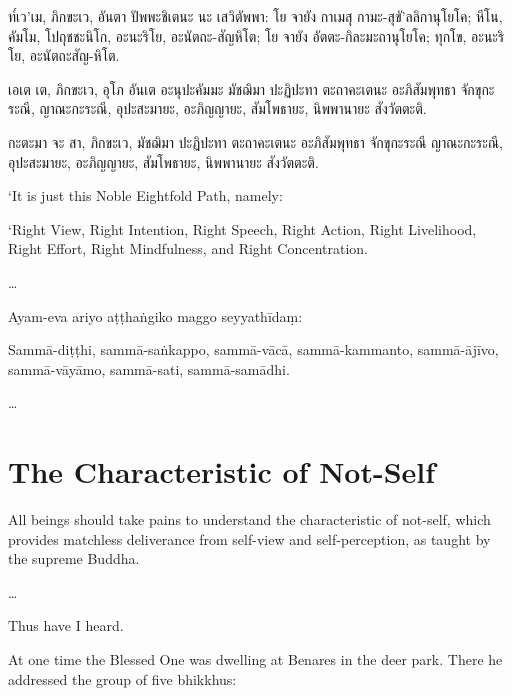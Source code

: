 ท๎เว’เม, ภิกขะเว, อันตา ปัพพะชิเตนะ นะ เสวิตัพพา: โย จายัง กาเมสุ
กามะ-สุขั’ลลิกานุโยโค; หีโน, คัมโม, โปถุชชะนิโก, อะนะริโย, อะนัตถะ-สัญหิโต; โย จายัง อัตตะ-กิละมะถานุโยโค; ทุกโข, อะนะริโย, อะนัตถะสัญ-หิโต.

เอเต เต, ภิกขะเว, อุโภ อันเต อะนุปะคัมมะ มัชฌิมา ปะฏิปะทา ตะถาคะเตนะ อะภิสัมพุทธา จักขุกะระณี, ญาณะกะระณี, อุปะสะมายะ, อะภิญญายะ, สัมโพธายะ, นิพพานายะ สังวัตตะติ.

กะตะมา จะ สา, ภิกขะเว, มัชฌิมา ปะฏิปะทา ตะถาคะเตนะ อะภิสัมพุทธา จักขุกะระณี ญาณะกะระณี, อุปะสะมายะ, อะภิญญายะ, สัมโพธายะ, นิพพานายะ สังวัตตะติ.

\clearpage

\englishText
\markboth{\englishTitle}{\rightmark}

‘It is just this Noble Eightfold Path, namely:

‘Right View, Right Intention, Right Speech, Right Action, Right
Livelihood, Right Effort, Right Mindfulness, and Right Concentration.

\ldots{}

\clearpage

\paliText
\markboth{\paliTitle}{\rightmark}

Ayam-eva ariyo aṭṭhaṅgiko maggo seyyathīdaṃ:

Sammā-diṭṭhi, sammā-saṅkappo, sammā-vācā, sammā-kammanto, sammā-ājīvo,
sammā-vāyāmo, sammā-sati, sammā-samādhi.

\ldots{}

\chapterTocDelegatePageNumber
\chapter{The Characteristic of Not-Self}

\setTocDelegatedPageNumber
\englishText
\renewcommand{\englishTitle}{The Characteristic of Not-Self}

\begin{leader}

All beings should take pains to understand the characteristic of
not-self, which provides matchless deliverance from self-view and
self-perception, as taught by the supreme Buddha.

\ldots{}

\end{leader}

Thus have I heard.

At one time the Blessed One was dwelling at Benares in the deer park.
There he addressed the group of five bhikkhus:

